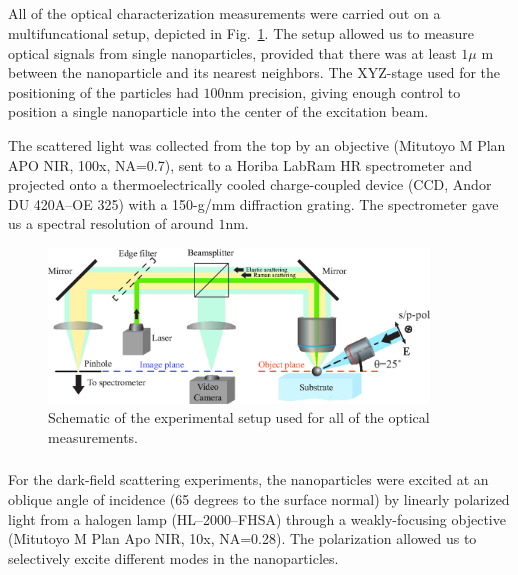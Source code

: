     \subsection{}
            All of the optical characterization measurements were carried out on a multifuncational setup, depicted in
            Fig.~\ref{fig:expSetup}. The setup allowed us to measure optical signals from single nanoparticles, provided that
            there was at least $1\mu$ m between the nanoparticle and its nearest neighbors. The XYZ-stage used for the
            positioning of the particles had $100$nm precision, giving enough control to position a single nanoparticle into
            the center of the excitation beam.

            The scattered light was collected from the top by an objective (Mitutoyo M Plan APO NIR, 100x, NA=0.7),
            sent to a Horiba LabRam HR spectrometer and projected onto a thermoelectrically cooled charge-coupled device
            (CCD, Andor DU 420A--OE 325) with a 150-g/mm diffraction grating. The spectrometer gave us a spectral resolution
            of around $1$nm.

            \begin{figure}[!ht]
                    \begin{center}
                        \includegraphics[width=0.9\textwidth]{figs/methods/expSetup2.eps}
                    \end{center}
                    \caption{Schematic of the experimental setup used for all of the optical measurements.}
                    \label{fig:expSetup}
            \end{figure}


        \subsubsection{}
            \label{sec:Darkfield}
                For the dark-field scattering experiments, the nanoparticles were excited at an oblique angle of incidence
            (65 degrees to the surface normal) by linearly polarized light from a halogen lamp (HL--2000--FHSA)
            through a weakly-focusing objective (Mitutoyo M Plan Apo NIR, 10x, NA=0.28). The polarization allowed us to
            selectively excite different modes in the nanoparticles\cite{permyakov2015probing}.

